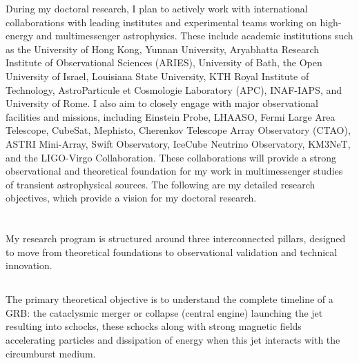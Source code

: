 \vspace{0.10 cm}

During my doctoral research, I plan to actively work with international collaborations with leading institutes and experimental teams working on high-energy and multimessenger astrophysics. These include academic institutions such as the University of Hong Kong, Yunnan University, Aryabhatta Research Institute of Observational Sciences (ARIES), University of Bath, the Open University of Israel, Louisiana State University, KTH Royal Institute of Technology, AstroParticule et Cosmologie Laboratory (APC), INAF-IAPS, and University of Rome. I also aim to closely engage with major observational facilities and missions, including Einstein Probe, LHAASO, Fermi Large Area Telescope, CubeSat, Mephisto, Cherenkov Telescope Array Observatory (CTAO), ASTRI Mini-Array, Swift Observatory, IceCube Neutrino Observatory, KM3NeT, and the LIGO-Virgo Collaboration. These collaborations will provide a strong observational and theoretical foundation for my work in multimessenger studies of transient astrophysical sources. The following are my detailed research objectives, which provide a vision for my doctoral research. 

\section*{\fontsize{12.5 pt}{10 pt}\selectfont{Detailed Research Objectives}}

\hfill

My research program is structured around three interconnected pillars, designed to move from theoretical foundations to observational validation and technical innovation.

\subsection*{\fontsize{12 pt}{10 pt}\selectfont{Pillar 1: Theory and Modelling :}}

The primary theoretical objective is to understand the complete timeline of a GRB: the cataclysmic merger or collapse (central engine) launching the jet resulting into schocks, these schocks along with strong magnetic fields accelerating particles and dissipation of energy when this jet interacts with the circumburst medium.

\vspace{0.10 cm}

\subsubsection*{\fontsize{11.5 pt}{10 pt}\selectfont{Internal Shock Hydrodynamics (FS/RS Interplay) :}}

